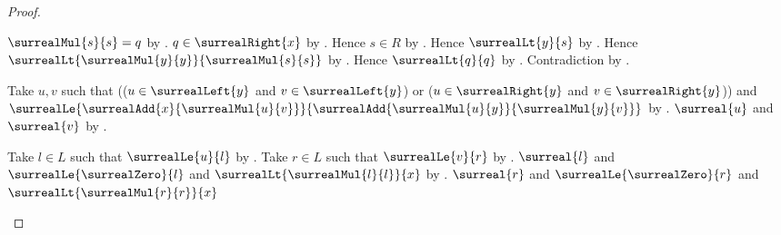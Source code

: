 \begin{proof}
\begin{subproof}
\begin{byCase}
                $\surrealMul{s}{s}=q$ by \auto.
            $q\in\surrealRight{x}$
                by .
            Hence $s\in R$
                by .
            Hence $\surrealLt{y}{s}$
                by .
            Hence $\surrealLt{\surrealMul{y}{y}}{
                \surrealMul{s}{s}}$
                by
                .
            Hence $\surrealLt{q}{q}$
                by
                .
            Contradiction by .
            \begin{byCase}
                    Take $u,v$ such that
                        (($u\in\surrealLeft{y}$ and
                            $v\in\surrealLeft{y}$) or
                         ($u\in\surrealRight{y}$ and
                            $v\in\surrealRight{y}$)) and
                        $\surrealLe{
                            \surrealAdd{x}{\surrealMul{u}{v}}}{
                            \surrealAdd{\surrealMul{u}{y}}{
                                \surrealMul{y}{v}}}$
                        by .
                    $\surreal{u}$ and $\surreal{v}$
                        by
                        .
                    \begin{byCase}
                            Take $l\in L$ such that
                                $\surrealLe{u}{l}$
                                by .
                            Take $r\in L$ such that
                                $\surrealLe{v}{r}$
                                by .
                            $\surreal{l}$ and
                                $\surrealLe{\surrealZero}{l}$ and
                                $\surrealLt{\surrealMul{l}{l}}{x}$
                                by \auto.
                            $\surreal{r}$ and
                                $\surrealLe{\surrealZero}{r}$ and
                                $\surrealLt{\surrealMul{r}{r}}{x}$

\end{byCase}
\end{byCase}
\end{byCase}
\end{subproof}
\end{proof}
